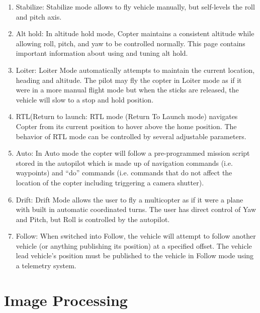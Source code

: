 \documentclass[12pt,a4paper]{report}
\begin{document}
\begin{enumerate}
\item Stabilize: Stabilize mode allows  to fly vehicle manually, but self-levels the roll and pitch axis.
\item Alt hold: In altitude hold mode, Copter maintains a consistent altitude while allowing roll, pitch, and yaw to be controlled normally. This page contains important information about using and tuning alt hold.
\item Loiter: Loiter Mode automatically attempts to maintain the current location, heading and altitude. The pilot may fly the copter in Loiter mode as if it were in a more manual flight mode but when the sticks are released, the vehicle will slow to a stop and hold position.
\item RTL(Return to launch: RTL mode (Return To Launch mode) navigates Copter from its current position to hover above the home position. The behavior of RTL mode can be controlled by several adjustable parameters. 
\item Auto: In Auto mode the copter will follow a pre-programmed mission script stored in the autopilot which is made up of navigation commands (i.e. waypoints) and “do” commands (i.e. commands that do not affect the location of the copter including triggering a camera shutter). 
\item Drift: Drift Mode allows the user to fly a multicopter as if it were a plane with built in automatic coordinated turns.
The user has direct control of Yaw and Pitch, but Roll is controlled by the autopilot. 
\item Follow: When switched into Follow, the vehicle will attempt to follow another vehicle (or anything publishing its position) at a specified offset. The vehicle lead vehicle’s position must be published to the vehicle in Follow mode using a telemetry system.

\end{enumerate}

\newpage
\section{Image Processing }
\end{document}
